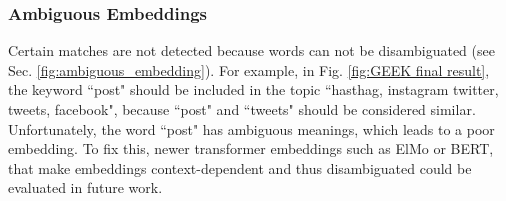     \subsubsection{Ambiguous Embeddings}
        Certain matches are not detected because words can not be disambiguated (see Sec. \ref{fig:ambiguous_embedding}). For example, in Fig. \ref{fig:GEEK final result}, the keyword ``post" should be included in the topic ``hasthag, instagram twitter, tweets, facebook", because ``post" and ``tweets" should be considered similar. Unfortunately, the word ``post" has ambiguous meanings, which leads to a poor embedding. To fix this, newer transformer embeddings such as ElMo\cite{peters2018elmo} or BERT\cite{devlin2018bert}, that make embeddings context-dependent and thus disambiguated could be evaluated in future work.
        
